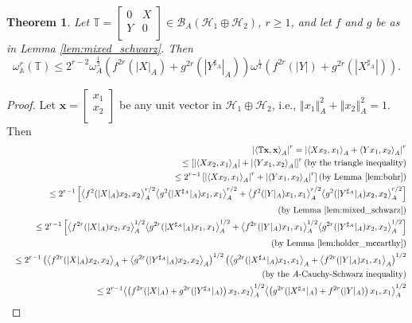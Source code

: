 \documentclass{article}
\newcommand{\bra}[1]{\left(#1\right)}
\newcommand{\sbra}[1]{\left[#1\right]}
\newcommand{\seqA}[1]{{\left<#1\right>}_{A}}
\newcommand{\normA}[1]{{\left\Vert#1\right\Vert}_{A}}
\newcommand{\abs}[1]{\left\vert#1\right\vert}
\newcommand {\A}{\mathbb{A}}
\newcommand {\T}{\mathbb{T}}
\newcommand {\Y}{\mathbb{Y}}
\newcommand {\h}{\mathcal{H}}
\newcommand {\Xa}{X^{\sharp_{A}}}
\renewcommand {\b}{\mathcal{B}}
\newcommand {\Ya}{Y^{\sharp_{A}}}
\newtheorem{theorem}{Theorem}[section]
\begin{document}
\begin{theorem}\label{theorem2.10} Let $\T=\begin{bmatrix} 0 &X \\Y& 0 \\\end{bmatrix}\in\b_A(\h_1\oplus\h_2)$, $r\geq 1$, and let $f$ and $g$
be as in Lemma \ref{lem:mixed_schwarz}. Then
\begin{equation*}
  \omega_{\A}^r(\T)\leq 2^{r-2}\omega_A^{\frac{1}{2}}\bra{f^{2r}(|X|_A)+g^{2r}(|\Ya|_A)}\omega^{\frac{1}{2}}\bra{f^{2r}(|Y|)+g^{2r}(|\Xa|)}.
\end{equation*}
\end{theorem}
\begin{proof} Let $\mathbf{x}=\begin{bmatrix} x_1 \\ x_2 \\\end{bmatrix}$ be any unit vector in $\h_1\oplus\h_2$, i.e., $\normA{x_1}^2+\normA{x_2}^2=1$.
Then
\begin{eqnarray*}
 &&\abs{\seqA{\T\mathbf{x},\mathbf{x}}}^{r}=\abs{\seqA{Xx_2,x_1}+\seqA{Yx_1,x_2}}^r\\
 &&\leq \sbra{\abs{\seqA{Xx_2,x_1}}+\abs{\seqA{Yx_1,x_2}}}^{r} \bra{\mbox{by the triangle inequality}}\\
  && \leq 2^{r-1}\sbra{\abs{\seqA{Xx_2,x_1}}^r+\abs{\seqA{Yx_1,x_2}}^r}\bra{\mbox{by Lemma \ref{lem:bohr}}}\\
  &&\leq 2^{r-1}\sbra{\seqA{f^2(|X|_A)x_2,x_2}^{r/2}\seqA{g^2(|\Xa|_A)x_1,x_1}^{r/2}
  +\seqA{f^2(|Y|_A)x_1,x_1}^{r/2}\seqA{g^2(|\Ya|_A)x_2,x_2}^{r/2}}\\
  &&\bra{\mbox{by Lemma \ref{lem:mixed_schwarz}}}\\
  &&\leq 2^{r-1}\sbra{\seqA{f^{2r}(|X|_A)x_2,x_2}^{1/2}\seqA{g^{2r}(|\Xa|_A)x_1,x_1}^{1/2}
  +\seqA{f^{2r}(|Y|_A)x_1,x_1}^{1/2}\seqA{g^{2r}(|\Ya|_A)x_2,x_2}^{1/2}}\\
  &&\bra{\mbox{by Lemma \ref{lem:holder_mccarthy}}}\\
    &&\leq 2^{r-1}\bra{\seqA{f^{2r}(|X|_A)x_2,x_2}+\seqA{g^{2r}(|\Ya|_A)x_2,x_2}}^{1/2}\bra{\seqA{g^{2r}(|\Xa|_A)x_1,x_1}+\seqA{f^{2r}(|Y|_A)x_1,x_1}}^{1/2}\\
  &&\bra{\mbox{by the $A$-Cauchy-Schwarz inequality}}\\
  &&\leq 2^{r-1}\seqA{\bra{f^{2r}(|X|_A)+g^{2r}(|\Ya|_A)}x_2,x_2}^{1/2}\seqA{\bra{g^{2r}(|\Xa|_A)+f^{2r}(|Y|_A)}x_1,x_1}^{1/2}\\

\end{eqnarray*}
\end{proof}
\end{document}
